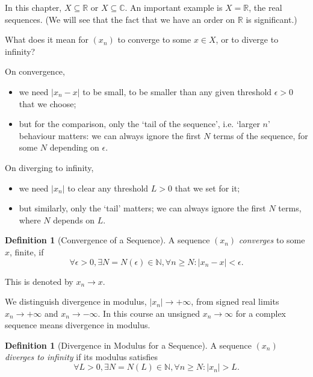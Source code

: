 \documentclass[11pt]{article}
\numberwithin{equation}{section}
\theoremstyle{definition}
\newtheorem{definition}[theorem]{Definition}
\theoremstyle{remark}
\newcommand{\pqty}[1]{\left(#1\right)}
\newcommand{\abs}[1]{\left|#1\right|}
\newcommand{\RR}{\mathbb R}
\newcommand{\CC}{\mathbb C}
\newcommand{\NN}{\mathbb N}
\begin{document}
In this chapter, \(X \subseteq \RR\) or \(X \subseteq \CC\). An important example is \(X = \RR\), the real sequences. (We will see that the fact that we have an order on \(\RR\) is significant.)

What does it mean for \(\pqty{x_n}\) to converge to some \(x \in X\), or to diverge to infinity?

On convergence,
\begin{itemize}
    \item we need \(\abs{x_n - x}\) to be small, to be smaller than any given threshold \(\epsilon > 0\) that we choose;
    \item but for the comparison, only the `tail of the sequence', i.e. `larger \(n\)' behaviour matters: we can always ignore the first \(N\) terms of the sequence, for some \(N\) depending on \(\epsilon\).
\end{itemize}

On diverging to infinity,
\begin{itemize}
    \item we need \(\abs{x_n}\) to clear any threshold \(L > 0\) that we set for it;
    \item but similarly, only the `tail' matters; we can always ignore the first \(N\) terms, where \(N\) depends on \(L\).
\end{itemize}

\begin{definition}[Convergence of a Sequence]\label{analysis-unit-0002}
    \label{def:seq-convergence}%
    A sequence \(\pqty{x_n}\) \emph{converges} to some \(x\), finite, if
    \[
        \forall \epsilon > 0, \exists N = N \pqty{\epsilon} \in \NN, \forall n \geq N: \abs{x_n - x} < \epsilon.
    \]
    
    This is denoted by \(x_n \to x\).
\end{definition}

We distinguish divergence in modulus, \(|x_n|\to+\infty\), from signed real
limits \(x_n\to+\infty\) and \(x_n\to-\infty\). In this course an unsigned
\(x_n\to\infty\) for a complex sequence means divergence in modulus.

\begin{definition}[Divergence in Modulus for a Sequence]\label{analysis-unit-0003}
    \label{def:seq-divergence-to-infinity}%
    A sequence \(\pqty{x_n}\) \emph{diverges to infinity} if its modulus satisfies
    \[
        \forall L > 0, \exists N = N \pqty{L} \in \NN, \forall n \geq N: \abs{x_n} > L.
    \]
\end{definition}
\end{document}
